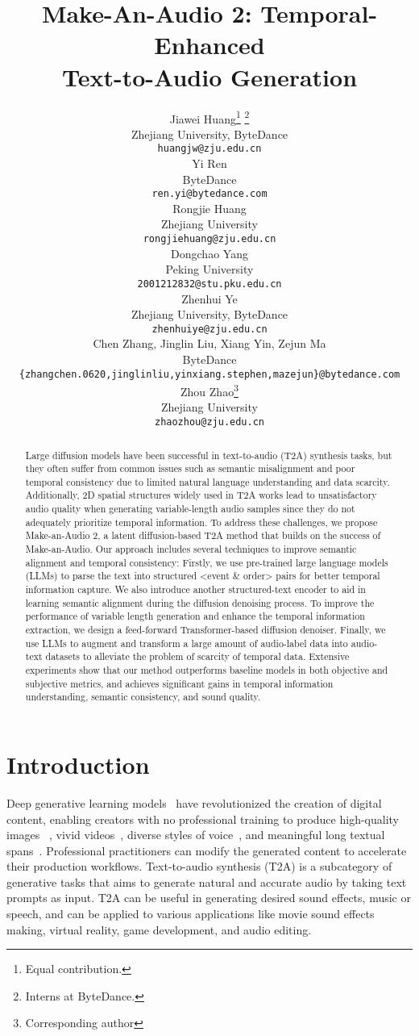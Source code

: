 \documentclass{article}
\title{Make-An-Audio 2: Temporal-Enhanced \\ Text-to-Audio Generation}
\author{
    Jiawei Huang\thanks{Equal contribution.} \thanks{Interns at ByteDance.}  \\
    Zhejiang University, ByteDance\\
    \texttt{huangjw@zju.edu.cn} \\
    \And
    Yi Ren\footnotemark[1]  \\
    ByteDance\\  \texttt{ren.yi@bytedance.com} \\
    \And
    Rongjie Huang \\
    Zhejiang University\\
    \texttt{rongjiehuang@zju.edu.cn} \\
    \And
    Dongchao Yang \\
    Peking University\\
    \texttt{2001212832@stu.pku.edu.cn} \\
    \And
    Zhenhui Ye\footnotemark[2] \\
    Zhejiang University, ByteDance\\
    \texttt{zhenhuiye@zju.edu.cn} \\
    \And
    Chen Zhang, Jinglin Liu, Xiang Yin, Zejun Ma \\
    ByteDance\\
    \texttt{\{zhangchen.0620,jinglinliu,yinxiang.stephen,mazejun\}@bytedance.com} \\
    \And
    Zhou Zhao\thanks{Corresponding author} \\
    Zhejiang University \\
    \texttt{zhaozhou@zju.edu.cn} \\
}
\begin{document}
\maketitle
\begin{abstract}
Large diffusion models have been successful in text-to-audio (T2A) synthesis tasks, but they often suffer from common issues such as semantic misalignment and poor temporal consistency due to limited natural language understanding and data scarcity. Additionally, 2D spatial structures widely used in T2A works lead to unsatisfactory audio quality when generating variable-length audio samples since they do not adequately prioritize temporal information. To address these challenges, we propose Make-an-Audio 2, a latent diffusion-based T2A method that builds on the success of Make-an-Audio. Our approach includes several techniques to improve semantic alignment and temporal consistency: Firstly, we use pre-trained large language models (LLMs) to parse the text into structured <event \& order> pairs for better temporal information capture. We also introduce another structured-text encoder to aid in learning semantic alignment during the diffusion denoising process. To improve the performance of variable length generation and enhance the temporal information extraction, we design a feed-forward Transformer-based diffusion denoiser. Finally, we use LLMs to augment and transform a large amount of audio-label data into audio-text datasets to alleviate the problem of scarcity of temporal data. Extensive experiments show that our method outperforms baseline models in both objective and subjective metrics, and achieves significant gains in temporal information understanding, semantic consistency, and sound quality.
\end{abstract}

\section{Introduction}
Deep generative learning models~\cite{goodfellow2020generative,kingma2018glow,ho2020denoising} have revolutionized the creation of digital content, enabling creators with no professional training to produce high-quality images 
~\cite{rombach2022high,saharia2022photorealistic,nicholGLIDEPhotorealisticImage2021}, vivid videos~\cite{hong2022cogvideo,singer2022make}, diverse styles of voice~\cite{huang2022generspeech}, and meaningful long textual spans~\cite{zhang2022opt,openai2023gpt4}. 
Professional practitioners can modify the generated content to accelerate their production workflows. Text-to-audio synthesis (T2A) is a subcategory of generative tasks that aims to generate natural and accurate audio by taking text prompts as input. T2A can be useful in generating desired sound effects, music or speech, and can be applied to various applications like movie sound effects making, virtual reality, game development, and audio editing.
\end{document}
